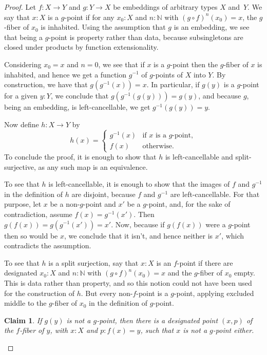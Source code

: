 \documentclass{article}
\newtheorem{claim}[theorem]{Claim}
\theoremstyle{definition}
\begin{document}
\begin{proof}
Let $f : X \to Y$ and $g : Y \to X$ be embeddings of arbitrary types $X$ and~$Y$.
%
We say that $x:X$ is a $g$-point if for any $x_0 : X$ and
$n : \mathbb{N}$ with $(g \circ f)^n (x_0)=x$, the $g$-fiber of $x_0$
is inhabited. Using the assumption that $g$ is an embedding, we see
that being a $g$-point is property rather than data, because
subsingletons are closed under products by function extensionality.

Considering $x_0=x$ and $n=0$, we see that if $x$ is a $g$-point then
the $g$-fiber of $x$ is inhabited, and hence we get a function
$g^{-1}$ of $g$-points of $X$ into $Y$. By construction, we have that
$g(g^{-1}(x))=x$. In particular, if $g(y)$ is a $g$-point for a given
$y:Y$, we conclude that $g(g^{-1}(g(y)))=g(y)$, and because $g$, being
an embedding, is left-cancellable, we get $g^{-1}(g(y))=y$.

Now define $h:X \to Y$ by
\[
  h(x) = \begin{cases}
           g^{-1}(x) & \text{if $x$ is a $g$-point}, \\
           f(x) & \text{otherwise.}
         \end{cases}
\]
To conclude the proof, it is enough to show that $h$ is left-cancellable and split-surjective, as any such map is an equivalence.

To see that $h$ is left-cancellable, it is enough to show that the
images of $f$ and $g^{-1}$ in the definition of $h$ are disjoint,
because $f$ and $g^{-1}$ are left-cancellable. For that purpose, let
$x$ be a non-$g$-point and $x'$ be a $g$-point, and, for the sake of
contradiction, assume $f(x) = g^{-1}(x')$. Then
$g(f(x))=g(g^{-1}(x'))=x'$. Now, because if $g(f(x))$ were a $g$-point
then so would be $x$, we conclude that it isn't, and hence neither is
$x'$, which contradicts the assumption.

To see that $h$ is a split surjection, say that $x : X$ is an $f$-point if there are designated $x_0 : X$ and $n : \mathbb{N}$ with $(g \circ f)^n (x_0)=x$ and the $g$-fiber of $x_0$ empty. This is data rather than property, and so this notion could not have been used for the construction of $h$. But every non-$f$-point is a $g$-point, applying excluded middle to the $g$-fiber of $x_0$ in the definition of $g$-point.

\begin{claim}
  If $g(y)$ is not a $g$-point, then there is a designated point
  $(x,p)$ of the $f$-fiber of $y$, with $x : X$ and $p : f(x)=y$,
  such that $x$ is not a $g$-point either.
\end{claim}


\end{proof}
\end{document}
